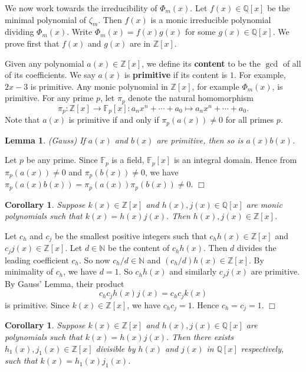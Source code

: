 \documentclass{article}
\def\Z{{\mathbb Z}}
\def\F{{\mathbb F}}
\def\N{{\mathbb N}}
\def\Q{{\mathbb Q}}
\def\Z{{\mathbb Z}}
\def\F{{\mathbb F}}
\def\Q{{\mathbb Q}}
\newtheorem{cor}[subsection]{Corollary}
\newtheorem{lemma}[subsection]{Lemma}
\newenvironment{proof}{\noindent {\bf Proof:}}{$\Box$ \vspace{2 ex}}
\begin{document}
We now work towards the irreducibility of $\Phi_m(x)$. Let $f(x)\in\Q[x]$ be the minimal polynomial of $\zeta_m$. Then $f(x)$ is a monic irreducible polynomial dividing $\Phi_m(x)$. Write $\Phi_m(x) = f(x)g(x)$ for some $g(x)\in\Q[x]$. We prove first that $f(x)$ and $g(x)$ are in $\Z[x]$.

Given any polynomial $a(x)\in\Z[x]$, we define its \textbf{content} to be the $\gcd$ of all of its coefficients. We say $a(x)$ is \textbf{primitive} if its content is $1$. For example, $2x - 3$ is primitive. Any monic polynomial in $\Z[x]$, for example $\Phi_m(x)$, is primitive. For any prime $p$, let $\pi_p$ denote the natural homomorphism $$\pi_p:\Z[x]\rightarrow\F_p[x]:a_nx^n + \cdots + a_0 \mapsto a_nx^n + \cdots + a_0.$$
Note that $a(x)$ is primitive if and only if $\pi_p(a(x))\neq 0$ for all primes $p$.


\begin{lemma}
    (Gauss) If $a(x)$ and $b(x)$ are primitive, then so is $a(x)b(x)$.
\end{lemma}

\begin{proof}
    Let $p$ be any prime. Since $\F_p$ is a field, $\F_p[x]$ is an integral domain. Hence from $\pi_p(a(x))\neq 0$ and $\pi_p(b(x))\neq 0$, we have $\pi_p(a(x)b(x)) = \pi_p(a(x))\pi_p(b(x))\neq 0$.
\end{proof}

\begin{cor}\label{cor:Gauss}
    Suppose $k(x)\in\Z[x]$ and $h(x),j(x)\in\Q[x]$ are monic polynomials such that $k(x) = h(x)j(x)$. Then $h(x),j(x)\in\Z[x]$.
\end{cor}

\begin{proof}
    Let $c_h$ and $c_j$ be the smallest positive integers such that $c_hh(x)\in\Z[x]$ and $c_jj(x)\in\Z[x]$. Let $d\in\N$ be the content of $c_hh(x)$. Then $d$ divides the leading coefficient $c_h$. So now $c_h/d\in\N$ and $(c_h/d)h(x)\in\Z[x]$. By minimality of $c_h$, we have $d = 1$. So $c_hh(x)$ and similarly $c_jj(x)$ are primitive. By Gauss' Lemma, their product $$c_hc_j h(x)j(x) = c_hc_j k(x)$$ is primitive. Since $k(x)\in\Z[x]$, we have $c_hc_j = 1$. Hence $c_h = c_j = 1$.
\end{proof}

\begin{cor}\label{cor:factorQ}
    Suppose $k(x)\in\Z[x]$ and $h(x),j(x)\in\Q[x]$ are polynomials such that $k(x) = h(x)j(x)$. Then there exists $h_1(x),j_1(x)\in\Z[x]$ divisible by $h(x)$ and $j(x)$ in $\Q[x]$ respectively, such that $k(x) = h_1(x)j_1(x)$.
\end{cor}
\end{document}

